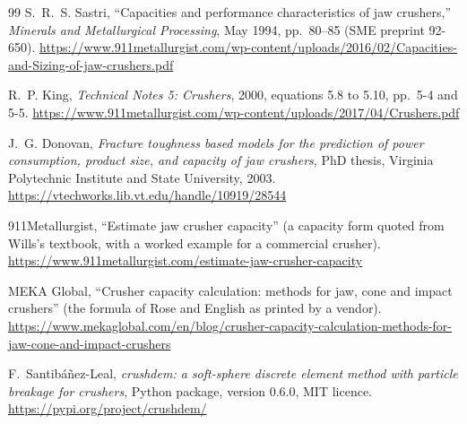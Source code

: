\begin{thebibliography}{99}
 S.~R.~S. Sastri, ``Capacities and performance characteristics of jaw crushers,'' \emph{Minerals and Metallurgical Processing},
May 1994, pp.~80--85 (SME preprint 92-650).
\url{https://www.911metallurgist.com/wp-content/uploads/2016/02/Capacities-and-Sizing-of-jaw-crushers.pdf}

 R.~P. King, \emph{Technical Notes 5: Crushers}, 2000, equations 5.8 to 5.10, pp.~5-4 and 5-5.
\url{https://www.911metallurgist.com/wp-content/uploads/2017/04/Crushers.pdf}

 J.~G. Donovan, \emph{Fracture toughness based models for the prediction of power consumption, product size, and capacity of jaw
crushers}, PhD thesis, Virginia Polytechnic Institute and State University, 2003. \url{https://vtechworks.lib.vt.edu/handle/10919/28544}

 911Metallurgist, ``Estimate jaw crusher capacity'' (a capacity form quoted from Wills's textbook, with a worked example for a commercial crusher).
\url{https://www.911metallurgist.com/estimate-jaw-crusher-capacity}

 MEKA Global, ``Crusher capacity calculation: methods for jaw, cone and impact crushers'' (the formula of Rose and English as printed by a vendor).
\url{https://www.mekaglobal.com/en/blog/crusher-capacity-calculation-methods-for-jaw-cone-and-impact-crushers}

 F.~Santib\'a\~nez-Leal, \emph{crushdem: a soft-sphere discrete element method with particle breakage for crushers}, Python package,
version 0.6.0, MIT licence. \url{https://pypi.org/project/crushdem/}

\end{thebibliography}
